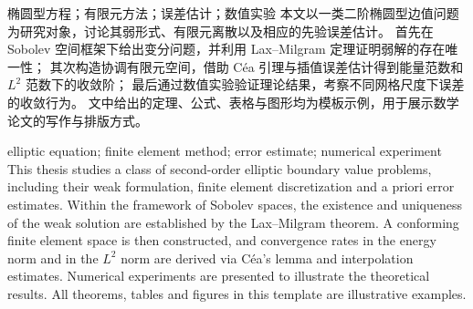 {}
\begin{cnabstract}{椭圆型方程；有限元方法；误差估计；数值实验}
本文以一类二阶椭圆型边值问题为研究对象，讨论其弱形式、有限元离散以及相应的先验误差估计。
首先在 Sobolev 空间框架下给出变分问题，并利用 Lax--Milgram 定理证明弱解的存在唯一性；
其次构造协调有限元空间，借助 Céa 引理与插值误差估计得到能量范数和 $L^2$ 范数下的收敛阶；
最后通过数值实验验证理论结果，考察不同网格尺度下误差的收敛行为。
文中给出的定理、公式、表格与图形均为模板示例，用于展示数学论文的写作与排版方式。
\end{cnabstract}

{}
\begin{enabstract}{elliptic equation; finite element method; error estimate; numerical experiment}
This thesis studies a class of second-order elliptic boundary value problems, including their
weak formulation, finite element discretization and a priori error estimates. Within the
framework of Sobolev spaces, the existence and uniqueness of the weak solution are established
by the Lax--Milgram theorem. A conforming finite element space is then constructed, and
convergence rates in the energy norm and in the $L^2$ norm are derived via Céa's lemma and
interpolation estimates. Numerical experiments are presented to illustrate the theoretical
results. All theorems, tables and figures in this template are illustrative examples.
\end{enabstract}

